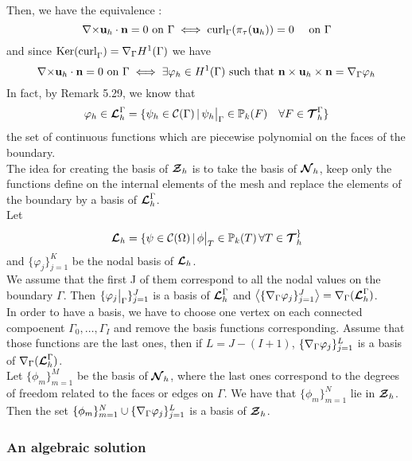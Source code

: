 Then, we have the equivalence :
\[ {\nabla\times}{\mathbf{u}}_h\cdot{\mathbf{n}}=0\mbox{ on }\Gamma \iff
\mathrm{curl}_\Gamma(\pi_\tau({\mathbf{u}}_h))=0\quad \mbox{ on } \Gamma \]
and since $\mathrm{Ker(curl}_\Gamma)={\nabla}_\Gamma H^1(\Gamma)$ we have 
\[ {\nabla\times}{\mathbf{u}}_h\cdot{\mathbf{n}}=0\mbox{ on }\Gamma \iff
\exists\varphi_h\in H^1(\Gamma) \mbox{ such that
}{\mathbf{n}}\times{\mathbf{u}}_h\times{\mathbf{n}} = {\nabla}_\Gamma\varphi_h \]
In fact, by \cite{}Remark 5.29, we know that 
\[\varphi_h\in{\bm{\mathcal{L}}}_h^\Gamma = \{\psi_h\in\mathcal{C}(\Gamma) \,|\,
\psi_h{\big\rvert_{\Gamma}}\in{\mathbb{P}}_k(F) \quad \forall F\in{\bm{\mathcal{T}}}_h^\Gamma \}\]
the set of continuous functions which are piecewise polynomial on the faces of
the boundary.\\

The idea for creating the basis of ${\bm{\mathcal{Z}}}_h$ is to take the basis of ${\bm{\mathcal{N}}}_h$, keep
only the functions define on the internal elements of the mesh and replace the
elements of the boundary by a basis of ${\bm{\mathcal{L}}}_h^\Gamma$.\\

Let \[ {\bm{\mathcal{L}}}_h=\{\psi\in\mathcal{C}(\Omega) \,|\,
\phi{\big\rvert_{T}}\in{\mathbb{P}}_k(T)\,\forall T\in{\bm{\mathcal{T}}}_h^\} \]
and $\{\varphi_j\}_{j=1}^K$ be the nodal basis of ${\bm{\mathcal{L}}}_h$.\\
We assume that the first J of them correspond to all the nodal values on the
boundary $\Gamma$. Then $\{\varphi_j{\big\rvert_{\Gamma}}\}_{j=1}^J$ is a
basis of ${\bm{\mathcal{L}}}_h^\Gamma$ and
$\left\langle\{{\nabla}_\Gamma\varphi_j\}_{j=1}^J\right\rangle={\nabla}_\Gamma({\bm{\mathcal{L}}}_h^\Gamma)$.\\
In order to have a basis, we have to choose one vertex on each connected
compoenent $\Gamma_0,\dots,\Gamma_I$ and remove the basis functions
corresponding. Assume that those functions are the last ones, then if
$L=J-(I+1)$, $\{{\nabla}_\Gamma\varphi_j\}_{j=1}^L$ is a basis of
${\nabla}_\Gamma({\bm{\mathcal{L}}}_h^\Gamma)$.\\
Let $\{\phi_m\}_{m=1}^M$ be the basis of ${\bm{\mathcal{N}}}_h$, where the last ones
correspond to the degrees of freedom related to the faces or edges on
$\Gamma$. We have that $\{\phi_m\}_{m=1}^N$ lie in ${\bm{\mathcal{Z}}}_h$.\\

Then the set $\{\phi_m\}_{m=1}^N\cup  \{{\nabla}_\Gamma\varphi_j\}_{j=1}^L$
is a basis of ${\bm{\mathcal{Z}}}_h$.

\subsubsection{An algebraic solution}


